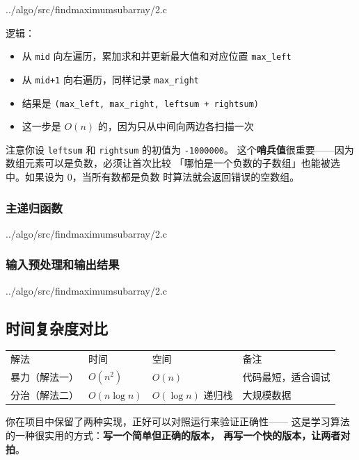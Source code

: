 
{../algo/src/findmaximumsubarray/2.c}

逻辑：

\begin{itemize}
    \item 从 \texttt{mid} 向左遍历，累加求和并更新最大值和对应位置 \texttt{max\_left}
    \item 从 \texttt{mid+1} 向右遍历，同样记录 \texttt{max\_right}
    \item 结果是 \texttt{(max\_left, max\_right, leftsum + rightsum)}
    \item 这一步是 \(O(n)\) 的，因为只从中间向两边各扫描一次
\end{itemize}

注意你设 \texttt{leftsum} 和 \texttt{rightsum} 的初值为 \texttt{-1000000}。
这个\textbf{哨兵值}很重要——因为数组元素可以是负数，必须让首次比较
「哪怕是一个负数的子数组」也能被选中。如果设为 0，当所有数都是负数
时算法就会返回错误的空数组。

\subsubsection{主递归函数}


{../algo/src/findmaximumsubarray/2.c}

\subsubsection{输入预处理和输出结果}


{../algo/src/findmaximumsubarray/2.c}

\subsection{时间复杂度对比}

\begin{center}
\begin{tabular}{llll}
解法 & 时间 & 空间 & 备注 \\
暴力（解法一） & \(O(n^2)\) & \(O(n)\) & 代码最短，适合调试 \\
分治（解法二） & \(O(n \log n)\) & \(O(\log n)\) 递归栈 & 大规模数据 \\
\end{tabular}
\end{center}

你在项目中保留了两种实现，正好可以对照运行来验证正确性——
这是学习算法的一种很实用的方式：\textbf{写一个简单但正确的版本，
再写一个快的版本，让两者对拍}。

